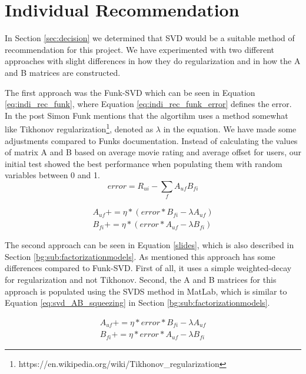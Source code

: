 \section{Individual Recommendation}\label{sec:individual_recommendation}
In Section \ref{sec:decision} we determined that SVD would be a suitable method of recommendation for this project. 
We have experimented with two different approaches with slight differences in how they do regularization and in how the A and B matrices are constructed.

The first approach was the Funk-SVD which can be seen in Equation \ref{eq:indi_rec_funk}, where Equation \ref{eq:indi_rec_funk_error} defines the error\cite{svdsimonfunk}. In the post Simon Funk mentions that the algortihm uses a method somewhat like Tikhonov regularization\footnote{https://en.wikipedia.org/wiki/Tikhonov\_regularization}, denoted as $\lambda$ in the equation. We have made some adjustments compared to Funks documentation\cite{svdsimonfunk}. Instead of calculating the values of matrix A and B based on average movie rating and average offset for users, our initial test showed the best performance when populating them with random variables between 0 and 1.
\begin{equation}\label{eq:indi_rec_funk_error}
error = R_{ui} - \sum_f A_{uf}B_{fi}
\end{equation}

\begin{equation}\label{eq:indi_rec_funk}
\begin{aligned}
A_{uf} += \eta * (error * B_{fi} - \lambda A_{uf}) \\
B_{fi} += \eta * (error * A_{uf} - \lambda B_{fi})
\end{aligned}
\end{equation}

The second approach can be seen in Equation \ref{slides}, which is also described in Section \ref{bg:sub:factorizationmodels}. As mentioned this approach has some differences compared to Funk-SVD. First of all, it uses a simple weighted-decay for regularization and not Tikhonov. Second, the A and B matrices for this approach is populated using the SVDS method in MatLab, which is similar to Equation \ref{eq:svd_AB_squeezing} in Section \ref{bg:sub:factorizationmodels}.

\begin{equation}\label{slides}
\begin{aligned}
A_{uf} += \eta * error *B_{fi} - \lambda A_{uf} \\
B_{fi} += \eta * error *A_{uf} - \lambda B_{fi} 
\end{aligned}
\end{equation}

